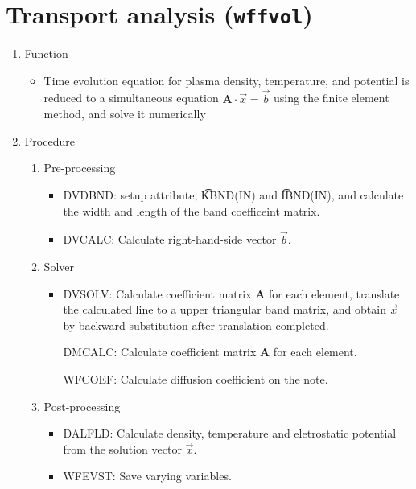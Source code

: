 \section{Transport analysis ({\tt wffvol})}
\begin{enumerate}
\item
Function
\begin{itemize}
\item
Time evolution equation for plasma density, temperature, and potential is
reduced to a simultaneous equation $\mathbf{A}\cdot\vec{x}=\vec{b}$
using the finite element method, and solve it numerically
\end{itemize}

\item
Procedure
\begin{enumerate}
\item
Pre-processing
\begin{itemize}
\item
DVDBND: setup attribute, \t{KBND(IN)} and \t{IBND(IN)}, and calculate the
width and length of the band coefficeint matrix.
\item
DVCALC: Calculate right-hand-side vector $\vec{b}$.
\end{itemize}
\item
Solver
\begin{itemize}
\item
DVSOLV: Calculate coefficient matrix $\mathbf{A}$ for each element,
translate the calculated line to a upper triangular band matrix, and
obtain $\vec{x}$ by backward substitution after translation completed.
\par\quad
DMCALC: Calculate coefficient matrix $\mathbf{A}$ for each element.
\par\quad\quad
WFCOEF: Calculate diffusion coefficient on the note.
\end{itemize}
\item
Post-processing
\begin{itemize}
\item
DALFLD: Calculate density, temperature and eletrostatic potential from
the solution vector $\vec{x}$.
\item
WFEVST: Save varying variables.
\end{itemize}
\end{enumerate}
\end{enumerate}

